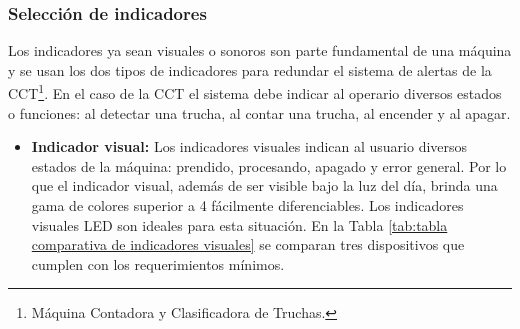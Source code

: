 \subsubsection{Selección de indicadores}

Los indicadores ya sean visuales o sonoros son parte fundamental de una máquina y se usan los dos tipos de indicadores para redundar el sistema de alertas de la CCT\footnote{Máquina Contadora y Clasificadora de Truchas.}. En el caso de la CCT el sistema debe indicar al operario diversos estados o funciones: al detectar una trucha, al contar una trucha, al encender y al apagar.

\begin{itemize}
	\item \textbf{Indicador visual:} Los indicadores visuales indican al usuario diversos estados de la máquina: prendido, procesando, apagado y error general. Por lo que el indicador visual, además de ser visible bajo la luz del día, brinda una gama de colores superior a 4 fácilmente diferenciables. Los indicadores visuales LED son ideales para esta situación. En la Tabla \ref{tab:tabla comparativa de indicadores visuales} se comparan tres dispositivos que cumplen con los requerimientos mínimos.	
	

\end{itemize}
